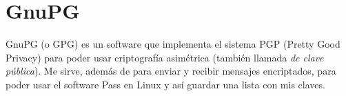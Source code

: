 \section{GnuPG}\label{sec:gnupg}
GnuPG (o GPG) es un software que implementa el sistema PGP (\foreignlanguage{english}{Pretty Good Privacy}) para
poder usar criptografía asimétrica (también llamada \emph{de clave pública}). Me sirve, además de para enviar y
recibir mensajes encriptados, para poder usar el software Pass en Linux y así guardar una lista con mis claves.
